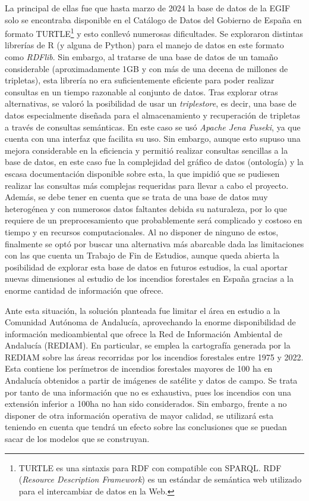\documentclass[12pt,a4paper,]{book}
\let\rmarkdownfootnote\footnote%
\def\footnote{\protect\rmarkdownfootnote}
\numberwithin{dummy}{section}
\theoremstyle{ocrenumbox}
\theoremstyle{blacknumex}
\theoremstyle{blacknumbox}
\theoremstyle{ocrenum}
\theoremstyle{ocrenum}
\begin{document}
La principal de ellas fue que hasta marzo de 2024 la base de datos de la
EGIF solo se encontraba disponible en el Catálogo de Datos del Gobierno
de España en formato TURTLE\footnote{TURTLE es una sintaxis para RDF con
  compatible con SPARQL. RDF (\emph{Resource Description Framework}) es
  un estándar de semántica web utilizado para el intercambiar de datos
  en la Web.} y esto conllevó numerosas dificultades. Se exploraron
distintas librerías de R (y alguna de Python) para el manejo de datos en
este formato como \emph{RDFlib}. Sin embargo, al tratarse de una base de
datos de un tamaño considerable (aproximadamente 1GB y con más de una
decena de millones de tripletas), esta librería no era suficientemente
eficiente para poder realizar consultas en un tiempo razonable al
conjunto de datos. Tras explorar otras alternativas, se valoró la
posibilidad de usar un \emph{triplestore}, es decir, una base de datos
especialmente diseñada para el almacenamiento y recuperación de
tripletas a través de consultas semánticas. En este caso se usó
\emph{Apache Jena Fuseki}, ya que cuenta con una interfaz que facilita
su uso. Sin embargo, aunque esto supuso una mejora considerable en la
eficiencia y permitió realizar consultas sencillas a la base de datos,
en este caso fue la complejidad del gráfico de datos (ontología) y la
escasa documentación disponible sobre esta, la que impidió que se
pudiesen realizar las consultas más complejas requeridas para llevar a
cabo el proyecto. Además, se debe tener en cuenta que se trata de una
base de datos muy heterogénea y con numerosos datos faltantes debida su
naturaleza, por lo que requiere de un preprocesamiento que probablemente
será complicado y costoso en tiempo y en recursos computacionales. Al no
disponer de ninguno de estos, finalmente se optó por buscar una
alternativa más abarcable dada las limitaciones con las que cuenta un
Trabajo de Fin de Estudios, aunque queda abierta la posibilidad de
explorar esta base de datos en futuros estudios, la cual aportar nuevas
dimensiones al estudio de los incendios forestales en España gracias a
la enorme cantidad de información que ofrece.

Ante esta situación, la solución planteada fue limitar el área en
estudio a la Comunidad Autónoma de Andalucía, aprovechando la enorme
disponibilidad de información medioambiental que ofrece la Red de
Información Ambiental de Andalucía (REDIAM). En particular, se emplea la
cartografía generada por la REDIAM sobre las áreas recorridas por los
incendios forestales entre 1975 y 2022. Esta contiene los perímetros de
incendios forestales mayores de 100 ha en Andalucía obtenidos a partir
de imágenes de satélite y datos de campo. Se trata por tanto de una
información que no es exhaustiva, pues los incendios con una extensión
inferior a 100ha no han sido considerados. Sin embargo, frente a no
disponer de otra información operativa de mayor calidad, se utilizará
esta teniendo en cuenta que tendrá un efecto sobre las conclusiones que
se puedan sacar de los modelos que se construyan.
\end{document}
